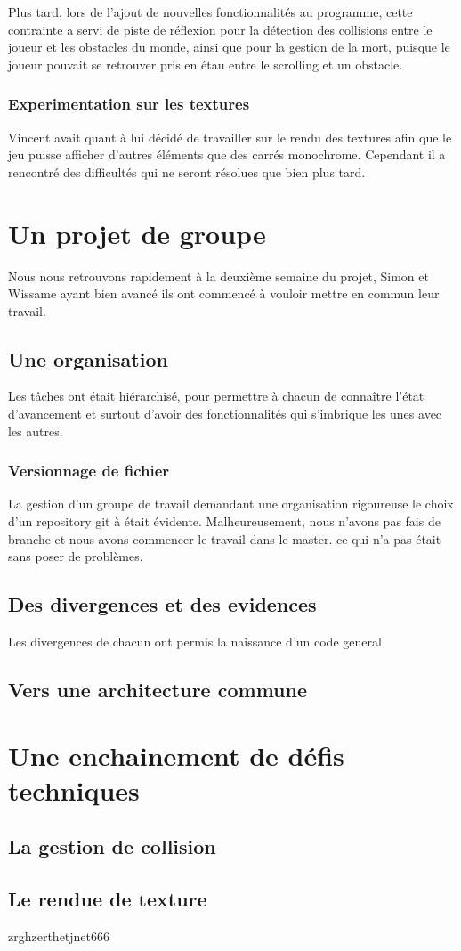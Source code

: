 \documentclass[french,12pt]{article}
\begin{document}
Plus tard, lors de l'ajout de nouvelles fonctionnalités au programme, cette contrainte a servi de piste de réflexion pour la détection des collisions entre le joueur et les obstacles du monde, ainsi que pour la gestion de la mort, puisque le joueur pouvait se retrouver pris en étau entre le scrolling et un obstacle.

\subsubsection{Experimentation sur les textures}

Vincent avait quant à lui décidé de travailler sur le rendu des textures afin que le jeu puisse afficher d'autres éléments que des carrés monochrome. Cependant il a rencontré des difficultés qui ne seront résolues que bien plus tard.

\section{Un projet de groupe}

Nous nous retrouvons rapidement à la deuxième semaine du projet, Simon et Wissame ayant bien avancé ils ont commencé à vouloir mettre en commun leur travail.

\subsection{Une organisation}

Les tâches ont était hiérarchisé, pour permettre à chacun de connaître l'état d'avancement et surtout d'avoir des fonctionnalités qui s'imbrique les unes avec les autres. 

\subsubsection{Versionnage de fichier}

La gestion d'un groupe de travail demandant une organisation rigoureuse le choix d'un repository git à était évidente. Malheureusement, nous n'avons pas fais de branche et nous avons commencer le travail dans le master. ce qui n'a pas était sans poser de problèmes.

\subsection{Des divergences et des evidences}
Les divergences de chacun ont permis la naissance d'un code general

\subsection{Vers une architecture commune}

\section{Une enchainement de défis techniques}
\subsection{La gestion de collision}

\subsection{Le rendue de texture}

zrghzerthetjnet666
\end{document}
